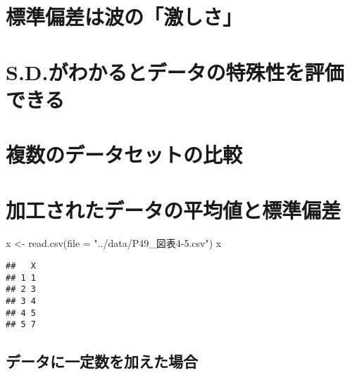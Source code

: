 \documentclass[
  12pt,
]{book}
\newenvironment{Shaded}{\begin{snugshade}}{\end{snugshade}}
\newcommand{\AttributeTok}[1]{\textcolor[rgb]{0.77,0.63,0.00}{#1}}
\newcommand{\FunctionTok}[1]{\textcolor[rgb]{0.00,0.00,0.00}{#1}}
\newcommand{\NormalTok}[1]{#1}
\newcommand{\OtherTok}[1]{\textcolor[rgb]{0.56,0.35,0.01}{#1}}
\newcommand{\StringTok}[1]{\textcolor[rgb]{0.31,0.60,0.02}{#1}}
\begin{document}
\hypertarget{ux6a19ux6e96ux504fux5deeux306fux6ce2ux306eux6fc0ux3057ux3055}{%
\section{標準偏差は波の「激しさ」}\label{ux6a19ux6e96ux504fux5deeux306fux6ce2ux306eux6fc0ux3057ux3055}}

\hypertarget{s.d.ux304cux308fux304bux308bux3068ux30c7ux30fcux30bfux306eux7279ux6b8aux6027ux3092ux8a55ux4fa1ux3067ux304dux308b}{%
\section{S.D.がわかるとデータの特殊性を評価できる}\label{s.d.ux304cux308fux304bux308bux3068ux30c7ux30fcux30bfux306eux7279ux6b8aux6027ux3092ux8a55ux4fa1ux3067ux304dux308b}}

\hypertarget{ux8907ux6570ux306eux30c7ux30fcux30bfux30bbux30c3ux30c8ux306eux6bd4ux8f03}{%
\section{複数のデータセットの比較}\label{ux8907ux6570ux306eux30c7ux30fcux30bfux30bbux30c3ux30c8ux306eux6bd4ux8f03}}

\hypertarget{ux52a0ux5de5ux3055ux308cux305fux30c7ux30fcux30bfux306eux5e73ux5747ux5024ux3068ux6a19ux6e96ux504fux5dee}{%
\section{加工されたデータの平均値と標準偏差}\label{ux52a0ux5de5ux3055ux308cux305fux30c7ux30fcux30bfux306eux5e73ux5747ux5024ux3068ux6a19ux6e96ux504fux5dee}}

\begin{Shaded}
\begin{Highlighting}[]
\NormalTok{x }\OtherTok{\textless{}{-}} \FunctionTok{read.csv}\NormalTok{(}\AttributeTok{file =} \StringTok{"../data/P49\_図表4{-}5.csv"}\NormalTok{)}
\NormalTok{x}
\end{Highlighting}
\end{Shaded}

\begin{verbatim}
##   X
## 1 1
## 2 3
## 3 4
## 4 5
## 5 7
\end{verbatim}

\hypertarget{ux30c7ux30fcux30bfux306bux4e00ux5b9aux6570ux3092ux52a0ux3048ux305fux5834ux5408}{%
\subsection*{データに一定数を加えた場合}\label{ux30c7ux30fcux30bfux306bux4e00ux5b9aux6570ux3092ux52a0ux3048ux305fux5834ux5408}}
\end{document}
